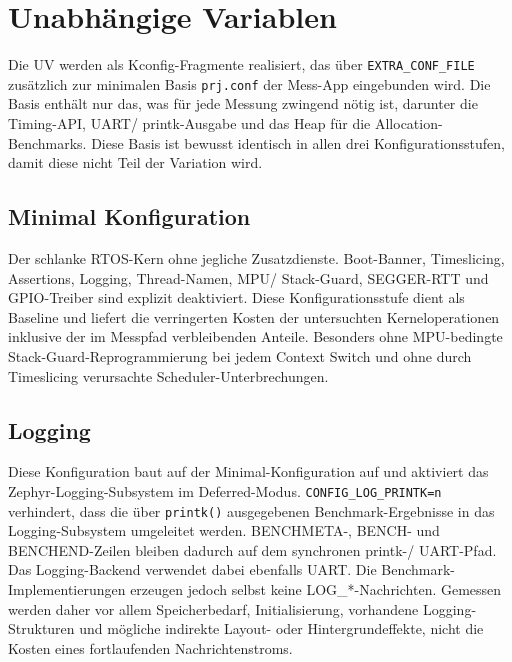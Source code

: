 \section{Unabhängige Variablen}
Die UV werden als Kconfig-Fragmente realisiert, das über \lstinline[style=fileinline]|EXTRA_CONF_FILE| zusätzlich zur minimalen Basis \lstinline[style=fileinline]|prj.conf| der Mess-App eingebunden wird. Die Basis enthält nur das, was für jede Messung zwingend nötig ist, darunter die Timing-API, UART/ printk-Ausgabe und das Heap für die Allocation-Benchmarks. Diese Basis ist bewusst identisch in allen drei Konfigurationsstufen, damit diese nicht Teil der Variation wird.

\subsection{Minimal Konfiguration}
Der schlanke RTOS-Kern ohne jegliche Zusatzdienste. Boot-Banner, Timeslicing, Assertions, Logging, Thread-Namen, MPU/ Stack-Guard, SEGGER-RTT und GPIO-Treiber sind explizit deaktiviert. Diese Konfigurationsstufe dient als Baseline und liefert die verringerten Kosten der untersuchten Kerneloperationen inklusive der im Messpfad verbleibenden Anteile. Besonders ohne MPU-bedingte Stack-Guard-Reprogrammierung bei jedem Context Switch und ohne durch Timeslicing verursachte Scheduler-Unterbrechungen.

\subsection{Logging}
Diese Konfiguration baut auf der Minimal-Konfiguration auf und aktiviert das Zephyr-Logging-Subsystem im Deferred-Modus. \lstinline[style=fileinline]|CONFIG_LOG_PRINTK=n| verhindert, dass die über \lstinline[style=fileinline]|printk()| ausgegebenen Benchmark-Ergebnisse in das Logging-Subsystem umgeleitet werden. BENCHMETA-, BENCH- und BENCHEND-Zeilen bleiben dadurch auf dem synchronen printk-/ UART-Pfad. Das Logging-Backend verwendet dabei ebenfalls UART. Die Benchmark-Implementierungen erzeugen jedoch selbst keine LOG\_*-Nachrichten. Gemessen werden daher vor allem Speicherbedarf, Initialisierung, vorhandene Logging-Strukturen und mögliche indirekte Layout- oder Hintergrundeffekte, nicht die Kosten eines fortlaufenden Nachrichtenstroms.

